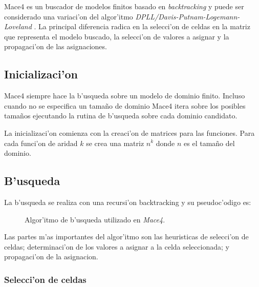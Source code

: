 Mace4 es un buscador de modelos finitos basado en \textit{backtracking} y puede ser considerado una variaci'on del algor'itmo \textit{DPLL/Davis-Putnam-Logemann-Loveland} . La principal diferencia radica en la selecci'on de celdas en la matriz que representa el modelo buscado, la selecci'on de valores a asignar y la propagaci'on de las asignaciones.

\subsection{Inicializaci'on}

Mace4 siempre hace la b'usqueda sobre un modelo de dominio finito. Incluso cuando no se especifica un tamaño de dominio Mace4 itera sobre los posibles tamaños ejecutando la rutina de b'usqueda sobre cada dominio candidato.

La inicializaci'on comienza con la creaci'on de matrices para las funciones. Para cada funci'on de aridad $k$ se crea una matriz $n^k$ donde $n$ es el tamaño del dominio.

\subsection{B'usqueda}

La b'usqueda se realiza con una recursi'on backtracking y su pseudoc'odigo es:

\begin{figure}[htbp]
\caption{Algor'itmo de b'usqueda utilizado en \textit{Mace4}.}
\label{fig:mace4_busqueda}
\end{figure}

Las partes m'as importantes del algor'itmo son las heuristicas de selecci'on de celdas; determinaci'on de los valores a asignar a la celda seleccionada; y propagaci'on de la asignacion.

\subsubsection{Selecci'on de celdas}

